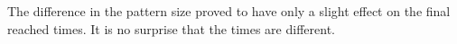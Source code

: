 The difference in the pattern size proved to have only a slight effect on the final reached times. It is no surprise that the times are different. %


\begin{figure}
\begin{minipage}{.5\linewidth}
\centering
{}
\end{minipage}%
\begin{minipage}{.5\linewidth}
\centering
{}
\end{minipage}\par\medskip


\end{figure}
